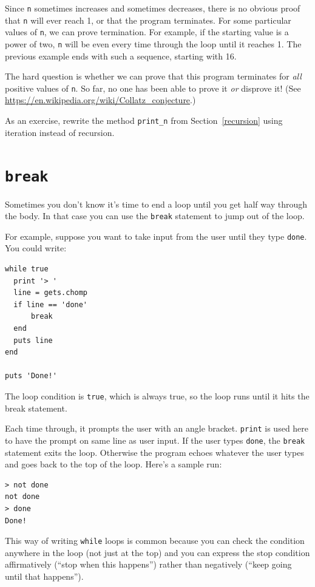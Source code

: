 \documentclass[10pt]{book}
\begin{document}
Since {\tt n} sometimes increases and sometimes decreases, there is no
obvious proof that {\tt n} will ever reach 1, or that the program
terminates.  For some particular values of {\tt n}, we can prove
termination.  For example, if the starting value is a power of two,
{\tt n} will be even every time through the loop
until it reaches 1. The previous example ends with such a sequence,
starting with 16.

The hard question is whether we can prove that this program terminates
for {\em all} positive values of {\tt n}.  So far, no one has
been able to prove it {\em or} disprove it!  (See
  \url{https://en.wikipedia.org/wiki/Collatz_conjecture}.)

As an exercise, rewrite the method \verb"print_n" from
Section~\ref{recursion} using iteration instead of recursion.


\section{{\tt break}}

Sometimes you don't know it's time to end a loop until you get half
way through the body.  In that case you can use the {\tt break}
statement to jump out of the loop.

For example, suppose you want to take input from the user until they
type {\tt done}.  You could write:

\begin{verbatim}
while true
  print '> '
  line = gets.chomp
  if line == 'done'
      break
  end
  puts line
end

puts 'Done!'
\end{verbatim}
%
The loop condition is {\tt true}, which is always true, so the
loop runs until it hits the break statement.

Each time through, it prompts the user with an angle bracket.
{\tt print} is used here to have the prompt on same line as user input.
If the user types {\tt done}, the {\tt break} statement exits
the loop.  Otherwise the program echoes whatever the user types
and goes back to the top of the loop.  Here's a sample run:

\begin{verbatim}
> not done
not done
> done
Done!
\end{verbatim}
%
This way of writing {\tt while} loops is common because you
can check the condition anywhere in the loop (not just at the
top) and you can express the stop condition affirmatively
(``stop when this happens'') rather than negatively (``keep going
until that happens'').
\end{document}
